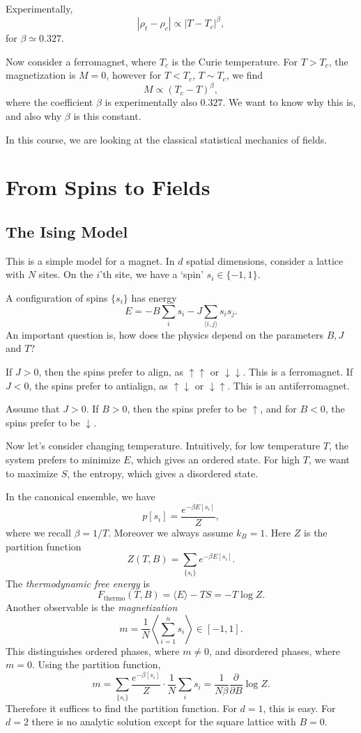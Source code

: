 \documentclass[12pt]{article}
\begin{document}
Experimentally,
\[
|\rho_t - \rho_c| \propto |T - T_c|^\beta,
\]
for $\beta \simeq 0.327$.

Now consider a ferromagnet, where $T_c$ is the Curie temperature. For $T > T_c$, the magnetization is $M = 0$, however for $T < T_c$, $T \sim T_c$, we find
\[
M \propto (T_c - T)^\beta,
\]
where the coefficient $\beta$ is experimentally also $0.327$. We want to know why this is, and also why $\beta$ is this constant.

In this course, we are looking at the classical statistical mechanics of fields.

\newpage

\section{From Spins to Fields}%
\label{sec:spin2field}

\subsection{The Ising Model}%
\label{sub:ising}

This is a simple model for a magnet. In $d$ spatial dimensions, consider a lattice with $N$ sites. On the $i$'th site, we have a `spin' $s_i \in \{-1, 1\}$.

A configuration of spins $\{s_i\}$ has energy
\[
E = - B \sum_i s_i - J \sum_{\langle i, j\rangle} s_i s_j.
\]
An important question is, how does the physics depend on the parameters $B, J$ and $T$?

If $J > 0$, then the spins prefer to align, as $\uparrow \uparrow$ or $\downarrow \downarrow$. This is a ferromagnet. If $J < 0$, the spins prefer to antialign, as $\uparrow \downarrow$ or $\downarrow \uparrow$. This is an antiferromagnet.

Assume that $J > 0$. If $B > 0$, then the spins prefer to be $\uparrow$, and for $B < 0$, the spins prefer to be $\downarrow$.

Now let's consider changing temperature. Intuitively, for low temperature $T$, the system prefers to minimize $E$, which gives an ordered state. For high $T$, we want to maximize $S$, the entropy, which gives a disordered state.

In the canonical ensemble, we have
\[
	p[s_i] = \frac{e^{-\beta E[s_i]}}{Z},
\]
where we recall $\beta = 1/T$. Moreover we always assume $k_B = 1$. Here $Z$ is the partition function
\[
	Z(T, B) = \sum_{\{s_i\}} e^{-\beta E[s_i]}.
\]
The \emph{thermodynamic free energy} is
\[
F_{\mathrm{thermo}}(T, B) = \langle E \rangle - TS = - T \log Z.
\]
Another observable is the \emph{magnetization}
\[
	m = \frac{1}{N} \left\langle \sum_{i = 1}^n s_i \right \rangle \in [-1, 1].
\]
This distinguishes ordered phases, where $m \neq 0$, and disordered phases, where $m = 0$. Using the partition function,
\[
	m = \sum_{\{s_i\}} \frac{e^{-\beta[s_i]}}{Z} \cdot \frac{1}{N} \sum_i s_i = \frac{1}{N \beta} \frac{\partial}{\partial B} \log Z.
\]
Therefore it suffices to find the partition function. For $d = 1$, this is easy. For $d = 2$ there is no analytic solution except for the square lattice with $B = 0$.
\end{document}
